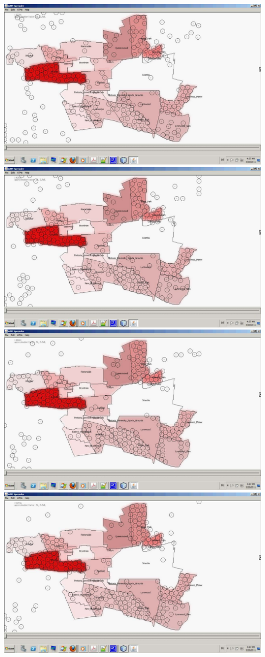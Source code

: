 \documentclass[12pt,a4paper]{article}
\begin{document}
\includegraphics[width=1.0\textwidth]{4.pdf}
\includegraphics[width=1.0\textwidth]{5.pdf}
\includegraphics[width=1.0\textwidth]{6.pdf}
\includegraphics[width=1.0\textwidth]{7.pdf}
\end{document}
